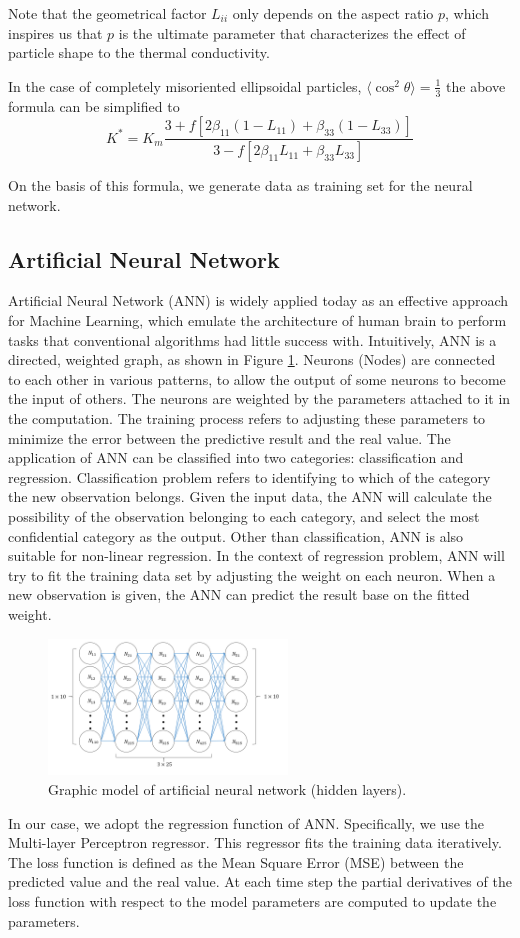 \documentclass[conference,compsoc]{IEEEtran}
\begin{document}
Note that the geometrical factor $L_{ii}$ only depends on the aspect ratio $p$, which inspires us that $p$ is the ultimate parameter that characterizes the effect of particle shape to the thermal conductivity.
  
In the case of completely misoriented ellipsoidal particles, $\langle \cos^2 \theta \rangle = \frac{1}{3}$ the above formula can be simplified to
\begin{equation}
\label{ellipsoid_formula}
K^* = K_m \frac{3+f[2\beta_{11}(1-L_{11})+\beta_{33}(1-L_{33})]}{3-f[2\beta_{11} L_{11} + \beta_{33} L_{33}]}
\end{equation}

On the basis of this formula, we generate data as training set for the neural network.

\subsection{Artificial Neural Network}
Artificial Neural Network (ANN) is widely applied today as an effective approach for Machine Learning, which emulate the architecture of human brain to perform tasks that conventional algorithms had little success with. Intuitively, ANN is a directed, weighted graph, as shown in Figure \ref{fig_ANN}. Neurons (Nodes) are connected to each other in various patterns, to allow the output of some neurons to become the input of others. The neurons are weighted by the parameters attached to it in the computation. The training process refers to adjusting these parameters to minimize the error between the predictive result and the real value. The application of ANN can be classified into two categories: classification and regression. Classification problem refers to identifying to which of the category the new observation belongs. Given the input data, the ANN will calculate the possibility of the observation belonging to each category, and select the most confidential category as the output. Other than classification, ANN is also suitable for non-linear regression. In the context of regression problem, ANN will try to fit the training data set by adjusting the weight on each neuron. When a new observation is given, the ANN can predict the result base on the fitted weight. 
\begin{figure}[!t]
\centering
\includegraphics[width=2.5in]{Model.png}
\caption{Graphic model of artificial neural network (hidden layers).}
\label{fig_ANN}
\end{figure}
In our case, we adopt the regression function of ANN. Specifically, we use the Multi-layer Perceptron regressor. This regressor fits the training data iteratively. The loss function is defined as the Mean Square Error (MSE) between the predicted value and the real value. At each time step the partial derivatives of the loss function with respect to the model parameters are computed to update the parameters.
\end{document}
